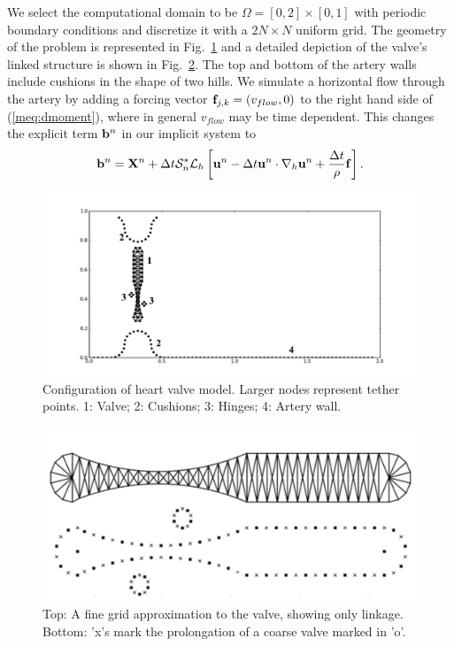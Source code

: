 We select the computational domain to be $\Omega=[0,2]\times[0,1]$  with periodic boundary conditions and  discretize it with a $2N\times N$ uniform grid. The geometry of the problem is
represented in Fig.~\ref{fig:ValveGeometry} and a detailed depiction of the valve's linked structure is shown in Fig.~\ref{fig:Valve1}. The top and bottom of the artery walls include cushions in the shape of two hills. We simulate a horizontal flow through the artery by adding a forcing vector $\mathbf{f}_{j,k}=(v_{flow},0)$ to the right hand side of (\ref{meq:dmoment}), where in general $v_{flow}$ may be time dependent. This changes the explicit term $\mathbf{b}^n$ in our implicit system to
\begin{equation}
\mathbf{b}^n=\mathbf{X}^n + \Delta t\mathcal{S}^*_n\mathcal{L}_h
\left[ \mathbf{u}^n - \Delta t\mathbf{u}^n \cdot \nabla_h \mathbf{u}^n + \frac{\Delta t}{\rho} \mathbf{f} \right].
\end{equation}
\begin{figure}[!b]
  \begin{center}
   \includegraphics[bb=1in .3in 11.5in 5.85in,width=5.25in,clip]{Images_Methodology/ValveGeometry.pdf}
  \end{center}
  \caption{\small Configuration of heart valve model. Larger nodes represent tether points. 1: Valve; 2: Cushions; 3: Hinges; 4: Artery wall.}
  \label{fig:ValveGeometry}
\end{figure}
\begin{figure}[!b]
  \begin{center}
    \includegraphics[bb=0in 0in 7.25in 3.3in,width=5.25in,clip]{Images_Methodology/Valve1.pdf}
  \end{center}
  \caption{\small Top: A fine grid approximation to the valve, showing only linkage. Bottom: 'x's mark the prolongation of a coarse valve marked in 'o'.}
  \label{fig:Valve1}
\end{figure}

